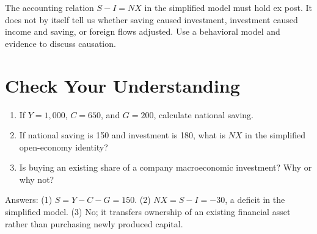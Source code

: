 \documentclass[11pt,letterpaper]{article}
\begin{document}
\begin{coreprinciple}
The accounting relation $S-I=NX$ in the simplified model must hold ex post. It does not by itself tell us whether saving caused investment, investment caused income and saving, or foreign flows adjusted. Use a behavioral model and evidence to discuss causation.
\end{coreprinciple}

\section{Check Your Understanding}
\begin{enumerate}
  \item If $Y=1{,}000$, $C=650$, and $G=200$, calculate national saving.
  \item If national saving is 150 and investment is 180, what is $NX$ in the simplified open-economy identity?
  \item Is buying an existing share of a company macroeconomic investment? Why or why not?
\end{enumerate}
Answers: (1) $S=Y-C-G=150$. (2) $NX=S-I=-30$, a deficit in the simplified model. (3) No; it transfers ownership of an existing financial asset rather than purchasing newly produced capital.
\end{document}
